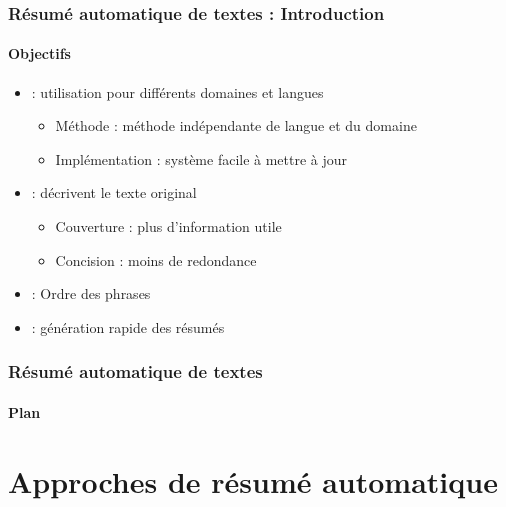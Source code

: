 \documentclass[xcolor=table]{beamer}
\begin{document}
\begin{frame}
\frametitle{Résumé automatique de textes : Introduction}
\framesubtitle{Objectifs}
	
	\begin{itemize}
		\item {} : utilisation pour différents domaines et langues 
		\begin{itemize}
			\item Méthode : méthode indépendante de langue et du domaine
			\item Implémentation : système facile à mettre à jour
		\end{itemize}
		\item {} : décrivent le texte original
		\begin{itemize}
			\item Couverture : plus d'information utile
			\item Concision : moins de redondance
		\end{itemize}
		\item {} : Ordre des phrases
		\item {} : génération rapide des résumés
	\end{itemize}
	
\end{frame}

\begin{frame}
\frametitle{Résumé automatique de textes}
\framesubtitle{Plan}

\begin{multicols}{2}
	\tableofcontents
\end{multicols}
\end{frame}

%
\section{Approches de résumé automatique} 
\end{document}
